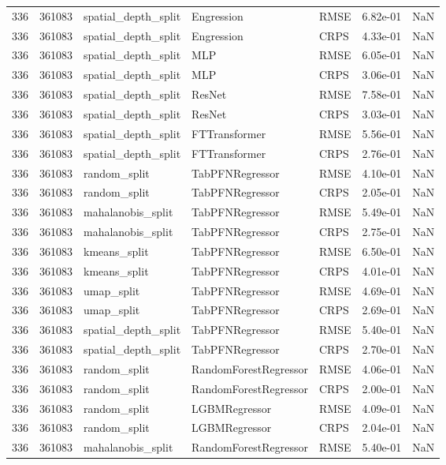 \begin{tabular}{rrlllrr}
336 & 361083 & spatial\_depth\_split & Engression & RMSE & 6.82e-01 & NaN \\
336 & 361083 & spatial\_depth\_split & Engression & CRPS & 4.33e-01 & NaN \\
336 & 361083 & spatial\_depth\_split & MLP & RMSE & 6.05e-01 & NaN \\
336 & 361083 & spatial\_depth\_split & MLP & CRPS & 3.06e-01 & NaN \\
336 & 361083 & spatial\_depth\_split & ResNet & RMSE & 7.58e-01 & NaN \\
336 & 361083 & spatial\_depth\_split & ResNet & CRPS & 3.03e-01 & NaN \\
336 & 361083 & spatial\_depth\_split & FTTransformer & RMSE & 5.56e-01 & NaN \\
336 & 361083 & spatial\_depth\_split & FTTransformer & CRPS & 2.76e-01 & NaN \\
336 & 361083 & random\_split & TabPFNRegressor & RMSE & 4.10e-01 & NaN \\
336 & 361083 & random\_split & TabPFNRegressor & CRPS & 2.05e-01 & NaN \\
336 & 361083 & mahalanobis\_split & TabPFNRegressor & RMSE & 5.49e-01 & NaN \\
336 & 361083 & mahalanobis\_split & TabPFNRegressor & CRPS & 2.75e-01 & NaN \\
336 & 361083 & kmeans\_split & TabPFNRegressor & RMSE & 6.50e-01 & NaN \\
336 & 361083 & kmeans\_split & TabPFNRegressor & CRPS & 4.01e-01 & NaN \\
336 & 361083 & umap\_split & TabPFNRegressor & RMSE & 4.69e-01 & NaN \\
336 & 361083 & umap\_split & TabPFNRegressor & CRPS & 2.69e-01 & NaN \\
336 & 361083 & spatial\_depth\_split & TabPFNRegressor & RMSE & 5.40e-01 & NaN \\
336 & 361083 & spatial\_depth\_split & TabPFNRegressor & CRPS & 2.70e-01 & NaN \\
336 & 361083 & random\_split & RandomForestRegressor & RMSE & 4.06e-01 & NaN \\
336 & 361083 & random\_split & RandomForestRegressor & CRPS & 2.00e-01 & NaN \\
336 & 361083 & random\_split & LGBMRegressor & RMSE & 4.09e-01 & NaN \\
336 & 361083 & random\_split & LGBMRegressor & CRPS & 2.04e-01 & NaN \\
336 & 361083 & mahalanobis\_split & RandomForestRegressor & RMSE & 5.40e-01 & NaN \\

\end{tabular}
